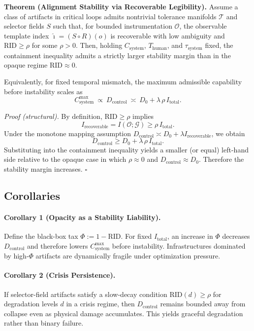 \documentclass[11pt]{article}
\begin{document}
\medskip
\noindent
\textbf{Theorem (Alignment Stability via Recoverable Legibility).}
Assume a class of artifacts in critical loops admits nontrivial tolerance
manifolds $\mathcal{T}$ and selector fields $S$ such that, for bounded
instrumentation $\mathcal{O}$, the observable template index
$\widehat{\imath}=(S\circ R)(o)$ is recoverable with low ambiguity and
$\text{RID} \geq \rho$ for some $\rho>0$.
Then, holding $C_{\text{system}}$, $T_{\text{human}}$, and $\tau_{\text{system}}$
fixed, the containment inequality admits a strictly larger stability margin
than in the opaque regime $\text{RID}\approx 0$.

Equivalently, for fixed temporal mismatch, the maximum admissible capability
before instability scales as
\[
C_{\text{system}}^{\max}\ \propto\ D_{\text{control}}
\ \asymp\ D_0 + \lambda\, \rho\, I_{\text{total}}.
\]

\medskip

\noindent
\emph{Proof (structural).}
By definition, $\text{RID}\ge \rho$ implies
\[
I_{\text{recoverable}} = I(\mathcal{O};\mathcal{G}) \ge \rho\, I_{\text{total}}.
\]
Under the monotone mapping assumption
$D_{\text{control}} \asymp D_0 + \lambda I_{\text{recoverable}}$,
we obtain
\[
D_{\text{control}} \ge D_0 + \lambda\, \rho\, I_{\text{total}}.
\]
Substituting into the containment inequality yields a smaller (or equal)
left-hand side relative to the opaque case in which $\rho\approx 0$ and
$D_{\text{control}}\approx D_0$. Therefore the stability margin increases.
\hfill $\square$

\subsection{Corollaries}

\paragraph{Corollary 1 (Opacity as a Stability Liability).}
Define the black-box tax $\Phi:=1-\text{RID}$. For fixed $I_{\text{total}}$,
an increase in $\Phi$ decreases $D_{\text{control}}$ and therefore lowers
$C_{\text{system}}^{\max}$ before instability. Infrastructures dominated by
high-$\Phi$ artifacts are dynamically fragile under optimization pressure.

\paragraph{Corollary 2 (Crisis Persistence).}
If selector-field artifacts satisfy a slow-decay condition
$\text{RID}(d)\ge \rho$ for degradation levels $d$ in a crisis regime,
then $D_{\text{control}}$ remains bounded away from collapse even as
physical damage accumulates. This yields graceful degradation rather than
binary failure.
\end{document}
